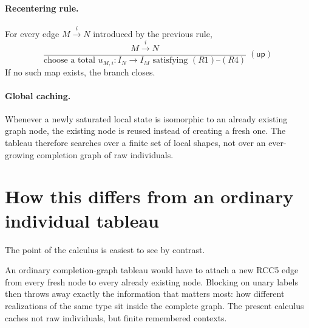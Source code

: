 \documentclass[11pt]{article}
\theoremstyle{definition}
\begin{document}
\paragraph{Recentering rule.}
For every edge $M\xrightarrow{i}N$ introduced by the previous rule,
\[
\frac{M\xrightarrow{i}N}{\text{choose a total }u_{M,i}:I_N\to I_M\text{ satisfying }(R1)\text{--}(R4)}\; (\mathsf{up})
\]
If no such map exists, the branch closes.

\paragraph{Global caching.}
Whenever a newly saturated local state is isomorphic to an already existing graph node, the existing node is reused instead of creating a fresh one. The tableau therefore searches over a finite set of local shapes, not over an ever-growing completion graph of raw individuals.

\section{How this differs from an ordinary individual tableau}

The point of the calculus is easiest to see by contrast.

\begin{center}
\end{center}

An ordinary completion-graph tableau would have to attach a new RCC5 edge from every fresh node to every already existing node. Blocking on unary labels then throws away exactly the information that matters most: how different realizations of the same type sit inside the complete graph. The present calculus caches not raw individuals, but finite remembered contexts.
\end{document}
